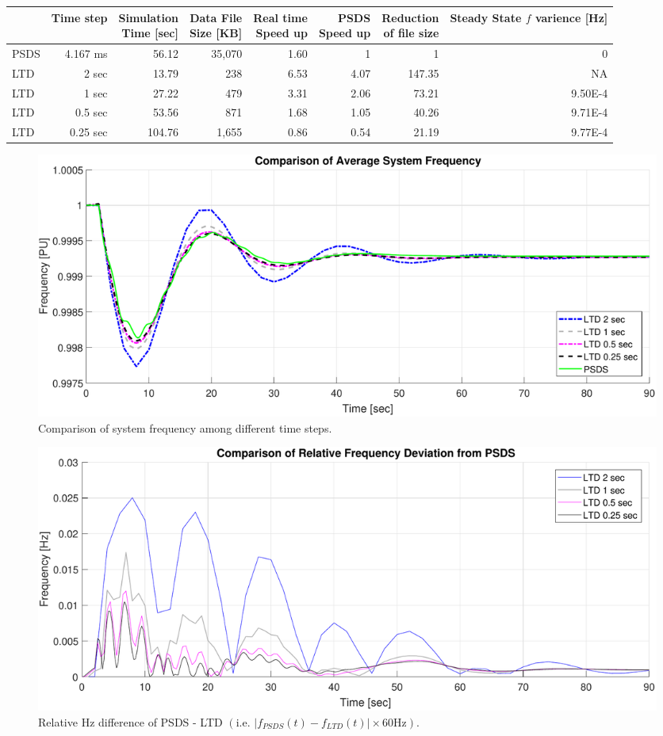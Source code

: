 \documentclass[12pt]{article}
\begin{document}
\begin{table}[!ht]
	\centering
	\footnotesize %
	\begin{tabular}{@{} lrrrrrrr @{}} 	
		\toprule %
		  & Time step  & \shortstack{Simulation\\ Time [sec] } & \shortstack{Data File \\Size [KB] }  & \shortstack{Real time \\Speed up}& \shortstack{ PSDS\\Speed up} & \shortstack{Reduction \\ of file size}  & \shortstack{Steady State $f$ \\ varience [Hz]}\\
		\midrule		
		PSDS	& 4.167 ms &  56.12   & 35,070 & 1.60& 1 & 1 & 0\\
		LTD		&	2 sec	& 13.79   &	238 &6.53&4.07 & 147.35 & NA \\ %
		LTD		&	1 sec	& 27.22   &	479 &3.31&2.06 & 73.21& 9.50E-4\\ %
		LTD		&	0.5 sec	& 53.56   &	871 &1.68&1.05 & 40.26 & 9.71E-4\\ %
		LTD		&	0.25 sec	& 104.76   &	1,655 &0.86&0.54 & 21.19& 9.77E-4\\ %
		\bottomrule
	\end{tabular}
\end{table} 
\vspace{-1em}
	\begin{figure}[h!]
			\centering
			\includegraphics[width=\linewidth]{tsComp}\vspace{-1em}
			\caption{Comparison of system frequency among different time steps.}
			\label{tsComp}		 
	\end{figure}\vspace{-.5em}

	\begin{figure}[h!]
			\centering
			\includegraphics[width=\linewidth]{tsCompRelF}\vspace{-1em}
			\caption{Relative Hz difference of PSDS - LTD $\left( \text{i.e. }  \left|f_{PSDS}(t)- f_{LTD}(t)\right| \times 60 \text{Hz} \right)$.}
			\label{tsComp}		 
	\end{figure}\vspace{-.5em}
\end{document}
